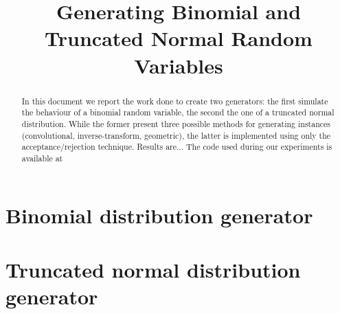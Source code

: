 \documentclass[conference, compsoc]{IEEEtran}
\begin{document}
\title{Generating Binomial and Truncated Normal Random Variables}
\author{
}

\maketitle

\begin{abstract}
In this document we report the work done to create two generators:
the first simulate the behaviour of a binomial random variable,
the second the one of a truncated normal distribution.
While the former present three possible methods for generating instances
(convolutional, inverse-transform, geometric), the latter is implemented using only the acceptance/rejection technique.
Results are... %
The code used during our experiments is available at \cite{code_repository}
\end{abstract}


\section{Binomial distribution generator}


\section{Truncated normal distribution generator}




\end{document}
